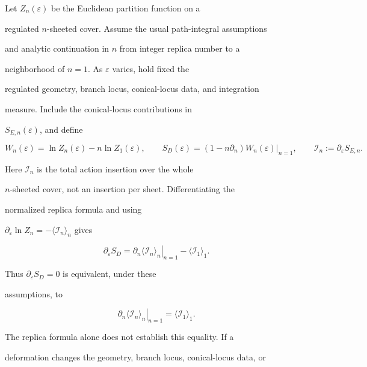 Let \(Z_n(\varepsilon)\) be the Euclidean partition function on a

regulated \(n\)-sheeted cover. Assume the usual path-integral assumptions

and analytic continuation in \(n\) from integer replica number to a

neighborhood of \(n=1\). As \(\varepsilon\) varies, hold fixed the

regulated geometry, branch locus, conical-locus data, and integration

measure. Include the conical-locus contributions in

\(S_{E,n}(\varepsilon)\), and define

\[

W_n(\varepsilon)=\ln Z_n(\varepsilon)-n\ln Z_1(\varepsilon),

\qquad

S_D(\varepsilon)

=(1-n\partial_n)W_n(\varepsilon)\big|_{n=1},

\qquad

\mathcal I_n:=\partial_\varepsilon S_{E,n}.

\]

Here \(\mathcal I_n\) is the total action insertion over the whole

\(n\)-sheeted cover, not an insertion per sheet. Differentiating the

normalized replica formula and using

\(\partial_\varepsilon\ln Z_n=-\langle\mathcal I_n\rangle_n\) gives

\[

\partial_\varepsilon S_D

=

\left.\partial_n\langle\mathcal I_n\rangle_n\right|_{n=1}

-\langle\mathcal I_1\rangle_1 .

\]

Thus \(\partial_\varepsilon S_D=0\) is equivalent, under these

assumptions, to

\[

\left.\partial_n\langle\mathcal I_n\rangle_n\right|_{n=1}

=\langle\mathcal I_1\rangle_1 .

\]

The replica formula alone does not establish this equality. If a

deformation changes the geometry, branch locus, conical-locus data, or

